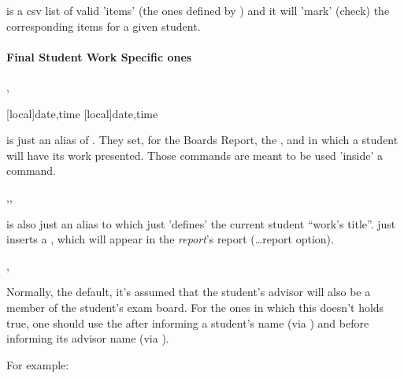 \documentclass[article,nogeometry,english,tocdepth=3,secdepth=3]{ufrgscca} %
\begin{document}
\begin{codedescribe}{\checklist}
    \begin{codesyntax}%
    \end{codesyntax}
     is a csv list of valid 'items' (the ones defined by \tsmacro{\checkdef}{}) and it will 'mark' (check) the corresponding items for a given student.
\end{codedescribe}


\paragraph{Final Student Work Specific ones}

\begin{codedescribe}{\studenttimeslot,\timeslot}
	\begin{codesyntax}%
		\tsmacro{\studenttimeslot}[local]{date,time}
		\tsmacro{\timeslot}[local]{date,time}
	\end{codesyntax}
\tsmacro{\timeslot}{} is just an alias of \tsmacro{\studenttimeslot}{}. They set, for the Boards Report, the ,  and  in which a student will have its work presented. Those commands are meant to be used 'inside' a \tsmacro{\NewStudent}{} command.
\end{codedescribe}



\begin{codedescribe}{\studentTCCtitle,\TCCtitle,\studentremark}
	\begin{codesyntax}%
		\tsmacro{\studentTCCtitle}{title}
		\tsmacro{\TCCtitle}{title}
		\tsmacro{\studentremark}{remark}
	\end{codesyntax}
\end{codedescribe}
\tsmacro{\TCCtitle}{} is also just an alias to \tsmacro{\studentTCCtitle}{} which just 'defines' the current student “work's title”. \tsmacro{\studentremark}{} just inserts a , which will appear in the \emph{report}'s report (\ldots report option).


\begin{codedescribe}{\DistinctBoard,\DefaultBoard}
	\begin{codesyntax}%
		\tsmacro{\DistinctBoard}{}
		\tsmacro{\DefaultBoard}{}
	\end{codesyntax}
Normally, the default, it's assumed that the student's advisor will also be a member of the student's exam board. For the ones in which this doesn't holds true, one should use the \tsmacro{\DistinctBoard}{} after informing a student's name (via \tsmacro{\student}{}) and before informing its advisor name (via \tsmacro{\advisor}{}). 
\end{codedescribe}
For example:
\end{document}
